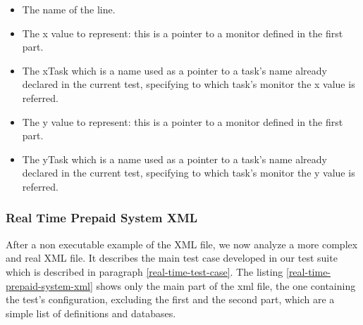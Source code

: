 \begin{description}
	\begin{itemize}
		\item The name of the line.
		\item The x value to represent: this is a pointer to a monitor defined in the first part.
		\item The xTask which is a name used as a pointer to a task's name already declared in the current test, specifying to which task's monitor the x value is referred.
		\item The y value to represent: this is a pointer to a monitor defined in the first part.
		\item The yTask which is a name used as a pointer to a task's name already declared in the current test, specifying to which task's monitor the y value is referred.
	\end{itemize}
	
\end{description}

			\subsubsection{Real Time Prepaid System XML}

After a non executable example of the XML file, we now analyze a more complex and real XML file. It describes the main test case developed in our test suite which is described in paragraph \ref{real-time-test-case}. The listing \ref{real-time-prepaid-system-xml} shows only the main part of the xml file, the one containing the test's configuration, excluding the first and the second part, which are a simple list of definitions and databases. 

